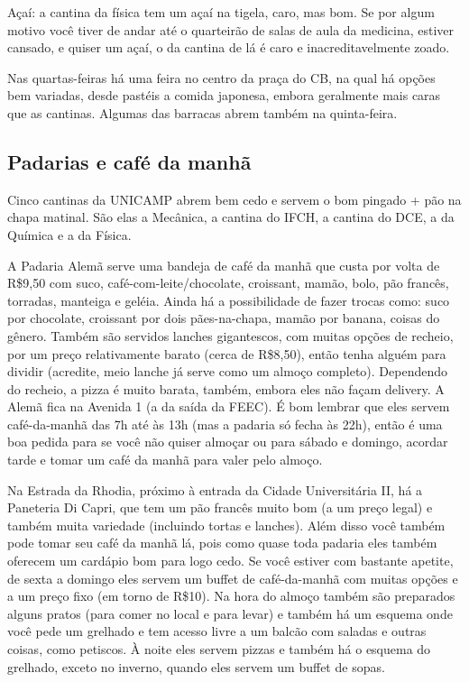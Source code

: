 \documentclass[a4paper,10pt]{article}
\begin{document}
Açaí: a cantina da física tem um açaí na tigela, caro, mas bom. Se por algum
motivo você tiver de andar até o quarteirão de salas de aula da medicina,
estiver cansado, e quiser um açaí, o da cantina de lá é caro
e inacreditavelmente zoado.

Nas quartas-feiras há uma feira no centro da praça do CB, na qual há opções bem
variadas, desde pastéis a comida japonesa, embora geralmente mais caras que as
cantinas. Algumas das barracas abrem também na quinta-feira. 

\subsection{Padarias e café da manhã}
Cinco cantinas da UNICAMP abrem bem cedo e servem o bom pingado + pão na chapa
matinal. São elas a Mecânica, a cantina do IFCH, a cantina do DCE, a da Química
e a da Física.

A Padaria Alemã serve uma bandeja de café da manhã que custa por volta de
R\$9,50 com suco, café-com-leite/chocolate, croissant, mamão, bolo, pão francês,
torradas, manteiga e geléia. Ainda há a possibilidade de fazer trocas como: suco
por chocolate, croissant por dois pães-na-chapa, mamão por banana, coisas do
gênero. Também são servidos lanches gigantescos, com muitas opções de recheio,
por um preço relativamente barato (cerca de R\$8,50), então tenha alguém para
dividir (acredite, meio lanche já serve como um almoço completo). Dependendo do
recheio, a pizza é muito barata, também, embora eles não façam delivery. A Alemã
fica na Avenida 1 (a da saída da FEEC). É bom lembrar que eles servem
café-da-manhã das 7h até às 13h (mas a padaria só fecha às 22h), então é uma boa
pedida para se você não quiser almoçar ou para sábado e domingo, acordar tarde
e tomar um café da manhã para valer pelo almoço.

Na Estrada da Rhodia, próximo à entrada da Cidade Universitária II, há
a Paneteria Di Capri, que tem um pão francês muito bom (a um preço legal)
e também muita variedade (incluindo tortas e lanches). Além disso você também
pode tomar seu café da manhã lá, pois como quase toda padaria eles também
oferecem um cardápio bom para logo cedo. Se você estiver com bastante apetite,
de sexta a domingo eles servem um buffet de café-da-manhã com muitas opções
e a um preço fixo (em torno de R\$10). Na hora do almoço também são preparados
alguns pratos (para comer no local e para levar) e também há um esquema onde
você pede um grelhado e tem acesso livre a um balcão com saladas e outras
coisas, como petiscos. À noite eles servem pizzas e também há o esquema do
grelhado, exceto no inverno, quando eles servem um buffet de sopas.
\end{document}
